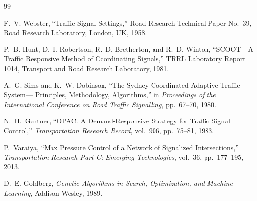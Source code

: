 \documentclass[3p,times]{elsarticle}
\theoremstyle{plain}
\theoremstyle{definition}
\begin{document}


\begin{thebibliography}{99}


F.~V. Webster,
``Traffic Signal Settings,''
Road Research Technical Paper No.~39,
Road Research Laboratory, London, UK, 1958.

P.~B. Hunt, D.~I. Robertson, R.~D. Bretherton, and R.~D. Winton,
``SCOOT---A Traffic Responsive Method of Coordinating Signals,''
TRRL Laboratory Report 1014,
Transport and Road Research Laboratory, 1981.

A.~G. Sims and K.~W. Dobinson,
``The Sydney Coordinated Adaptive Traffic System---
Principles, Methodology, Algorithms,''
in \textit{Proceedings of the International Conference on Road
Traffic Signalling}, pp.~67--70, 1980.

N.~H.~Gartner,
``OPAC: A Demand-Responsive Strategy for Traffic Signal Control,''
\textit{Transportation Research Record},
vol.~906, pp.~75--81, 1983.

P.~Varaiya,
``Max Pressure Control of a Network of Signalized Intersections,''
\textit{Transportation Research Part C: Emerging Technologies},
vol.~36, pp.~177--195, 2013.


D.~E. Goldberg,
\textit{Genetic Algorithms in Search, Optimization, and Machine
Learning},
Addison-Wesley, 1989.


\end{thebibliography}
\end{document}
